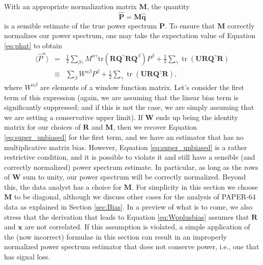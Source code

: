 \documentclass[preprint2,numberedappendix,tighten]{aastex6}  %
\DeclareMathOperator{\Tr}{tr}
\begin{document}
With an appropriate normalization matrix $\textbf{M}$, the quantity
\begin{equation}
\label{eq:phat}
\widehat{\textbf{P}} = \textbf{M}\widehat{\textbf{q}}
\end{equation}
is a sensible estimate of the true power spectrum $\textbf{P}$. To ensure that $\textbf{M}$ correctly normalizes our power spectrum, one may take the expectation value of Equation \eqref{eq:phat} to obtain
\begin{eqnarray}
\langle \widehat{P}^\alpha \rangle &=& \frac{1}{2} \sum_{\beta \gamma} M^{\alpha \gamma}  \textrm{tr} \left( \textbf{R}\textbf{Q}^{\gamma}\textbf{R} \textbf{Q}^{\beta}\right) P^\beta +\frac{1}{2} \sum_{ \gamma}  \Tr\left( \mathbf{U} \textbf{R} \textbf{Q}^{\gamma} \mathbf{R} \right) \nonumber \\
&\equiv & \sum_{\beta} W^{\alpha \beta} P^\beta +\frac{1}{2} \sum_{ \gamma}  \Tr\left( \mathbf{U} \textbf{R} \textbf{Q}^{\gamma} \mathbf{R} \right), \label{eq:Wpplusbias}
\end{eqnarray}
where $W^{\alpha \beta}$ are elements of a window function matrix. Let's consider the first term of this expression (again, we are assuming that the linear bias term is significantly suppressed; and if this is not the case, we are simply assuming that we are setting a conservative upper limit). If $\mathbf{W}$ ends up being the identity matrix for our choices of $\mathbf{R}$ and $\mathbf{M}$, then we recover Equation \eqref{eq:super_unbiased} for the first term, and we have an estimator that has no multiplicative matrix bias. However, Equation \eqref{eq:super_unbiased} is a rather restrictive condition, and it is possible to violate it and still have a sensible (and correctly normalized) power spectrum estimate. In particular, as long as the rows of $\mathbf{W}$ sum to unity, our power spectrum will be correctly normalized. Beyond this, the data analyst has a choice for $
\textbf{M}$. For simplicity in this section we choose $\textbf{M}$ to be diagonal, although we discuss other cases for the analysis 
of PAPER-64 data as explained in Section \ref{sec:Bias}. In a preview of what is to come, we also stress that the derivation that leads to Equation \eqref{eq:Wpplusbias} assumes that $\mathbf{R}$ and $\mathbf{x}$ are not correlated. If this assumption is violated, a simple application of the (now incorrect) formulae in this section can result in an improperly normalized power spectrum estimator that does not conserve power, i.e., one that has signal loss.
\end{document}
